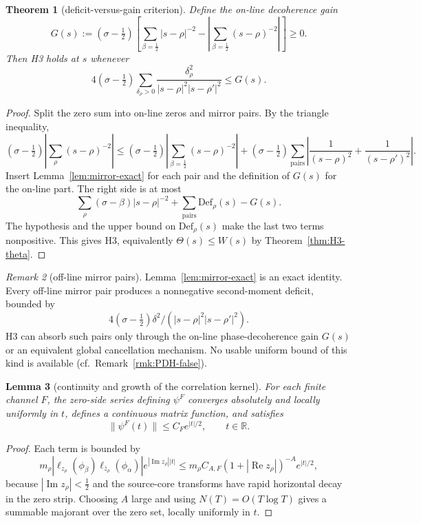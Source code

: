 \documentclass[11pt]{amsart}
\newtheorem{theorem}{Theorem}[section]
\newtheorem{lemma}[theorem]{Lemma}
\theoremstyle{definition}
\theoremstyle{remark}
\newtheorem{remark}[theorem]{Remark}
\theoremstyle{definition}
\renewcommand{\Re}{\operatorname{Re}}
\renewcommand{\Im}{\operatorname{Im}}
\newcommand{\half}{\tfrac{1}{2}}
\newcommand{\R}{\mathbb{R}}
\begin{document}
\begin{theorem}[deficit-versus-gain criterion]\label{thm:mirror-criterion}
Define the on-line decoherence gain
\[
   G(s):=(\sigma-\half)
   \left[
      \sum_{\beta=\half}|s-\rho|^{-2}
      -
      \left|\sum_{\beta=\half}(s-\rho)^{-2}\right|
   \right]\ge0.
\]
Then H3 holds at $s$ whenever
\[
   4(\sigma-\half)
   \sum_{\delta_\rho>0}
   \frac{\delta_\rho^2}{|s-\rho|^2|s-\rho'|^2}
   \le
   G(s).
\]
\end{theorem}

\begin{proof}
Split the zero sum into on-line zeros and mirror pairs.  By the triangle inequality,
\[
   (\sigma-\half)\left|\sum_\rho(s-\rho)^{-2}\right|
   \le
   (\sigma-\half)\left|\sum_{\beta=\half}(s-\rho)^{-2}\right|
   +
   (\sigma-\half)\sum_{\mathrm{pairs}}
   \left|
      \frac1{(s-\rho)^2}+\frac1{(s-\rho')^2}
   \right|.
\]
Insert Lemma~\ref{lem:mirror-exact} for each pair and the definition of $G(s)$ for the on-line part.
The right side is at most
\[
   \sum_\rho(\sigma-\beta)|s-\rho|^{-2}
   +
   \sum_{\mathrm{pairs}}\mathrm{Def}_\rho(s)
   -
   G(s).
\]
The hypothesis and the upper bound on $\mathrm{Def}_\rho(s)$ make the last two terms nonpositive.
This gives H3, equivalently $\Theta(s)\le W(s)$ by Theorem~\ref{thm:H3-theta}.
\end{proof}

\begin{remark}[off-line mirror pairs]\label{rmk:mirror-honest}
Lemma~\ref{lem:mirror-exact} is an exact identity.  Every off-line
mirror pair produces a nonnegative second-moment deficit, bounded by
\[
   4(\sigma-\half)\delta^2/(|s-\rho|^2|s-\rho'|^2).
\]
H3 can absorb such pairs only through the on-line phase-decoherence gain $G(s)$ or an equivalent
global cancellation mechanism.  No usable uniform bound of this kind is available (cf.\ Remark~\ref{rmk:PDH-false}).
\end{remark}

\begin{lemma}[continuity and growth of the correlation kernel]\label{lem:psi-growth}
For each finite channel $F$, the zero-side series defining $\psi^F$ converges absolutely and locally
uniformly in $t$, defines a continuous matrix function, and satisfies
\[
   \|\psi^F(t)\|\le C_F e^{|t|/2},\qquad t\in\R .
\]
\end{lemma}

\begin{proof}
Each term is bounded by
\[
   m_\rho|\ell_{z_\rho}(\phi_\beta)\ell_{\bar z_\rho}(\phi_\alpha)|e^{|\Im z_\rho||t|}
   \le
   m_\rho C_{A,F}(1+|\Re z_\rho|)^{-A}e^{|t|/2},
\]
because $|\Im z_\rho|<\half$ and the source-core transforms have rapid horizontal decay in the zero
strip.  Choosing $A$ large and using $N(T)=O(T\log T)$ gives a summable majorant over the zero set,
locally uniformly in $t$.
\end{proof}
\end{document}
